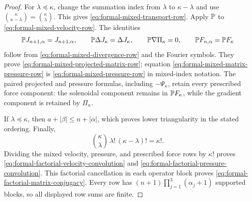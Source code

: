\begin{proof}
For \(\lambda\preceq\kappa\), change the summation index from \(\lambda\)
to \(\kappa-\lambda\) and use
\(\binom\kappa{\kappa-\lambda}=\binom\kappa\lambda\).  This gives
\eqref{eq:formal-mixed-transport-row}.  Apply \(\mathbb P\) to
\eqref{eq:formal-mixed-velocity-row}.  The identities
\[
 \mathbb P J_{n+1,\alpha}=J_{n+1,\alpha},
 \qquad
 \mathbb P\Delta J_\kappa=\Delta J_\kappa,
 \qquad
 \mathbb P\nabla\Pi_\kappa=0,
 \qquad
 \mathbb P F_{n,\alpha}=\mathbb P F_\kappa
\]
follow from \eqref{eq:formal-mixed-divergence-row} and the Fourier symbols.
They prove \eqref{eq:formal-mixed-projected-matrix-row}; equation
\eqref{eq:formal-mixed-matrix-pressure-row} is
\eqref{eq:formal-mixed-pressure-row} in mixed-index notation.  The paired
projected and pressure formulas, including \(-\Psi_\kappa\), retain every
prescribed force component: the solenoidal component remains in
\(\mathbb P F_\kappa\), while the gradient component is retained by
\(\Pi_\kappa\).

If \(\lambda\preceq\kappa\), then
\(a+|\beta|\le n+|\alpha|\), which proves lower triangularity in the stated
ordering.  Finally,
\[
 \binom\kappa\lambda\,\lambda!\,(\kappa-\lambda)!=\kappa!.
\]
Dividing the mixed velocity, pressure, and prescribed force rows by
\(\kappa!\) proves
\eqref{eq:formal-factorial-velocity-convolution} and
\eqref{eq:formal-factorial-pressure-convolution}.  This factorial cancellation in each operator block proves
\eqref{eq:formal-factorial-matrix-conjugacy}.  Every row has
\((n+1)\prod_{j=1}^3(\alpha_j+1)\) supported blocks, so all displayed row
sums are finite.
\end{proof}

